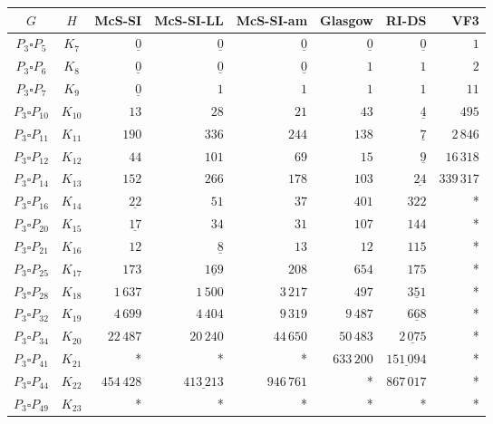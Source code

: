 
\begin{tabular}{ccrrrrrr}
    \toprule
    {$G$} & {$H$} & {McS-SI} & {McS-SI-LL} & {McS-SI-am} & Glasgow & RI-DS & VF3\\ 
    \midrule

$P_3\square P_{5}$ & $K_{7}$ & $\underline{0}$ & $\underline{0}$ & $\underline{0}$ & $\underline{0}$ & $\underline{0}$ & $1$\\
$P_3\square P_{6}$ & $K_{8}$ & $\underline{0}$ & $\underline{0}$ & $\underline{0}$ & $1$ & $1$ & $2$\\
$P_3\square P_{7}$ & $K_{9}$ & $\underline{0}$ & $1$ & $1$ & $1$ & $1$ & $11$\\
$P_3\square P_{10}$ & $K_{10}$ & $13$ & $28$ & $21$ & $43$ & $\underline{4}$ & $495$\\
$P_3\square P_{11}$ & $K_{11}$ & $190$ & $336$ & $244$ & $138$ & $\underline{7}$ & $2\,846$\\
$P_3\square P_{12}$ & $K_{12}$ & $44$ & $101$ & $69$ & $15$ & $\underline{9}$ & $16\,318$\\
$P_3\square P_{14}$ & $K_{13}$ & $152$ & $266$ & $178$ & $103$ & $\underline{24}$ & $339\,317$\\
$P_3\square P_{16}$ & $K_{14}$ & $\underline{22}$ & $51$ & $37$ & $401$ & $322$ & *\\
$P_3\square P_{20}$ & $K_{15}$ & $\underline{17}$ & $34$ & $31$ & $107$ & $144$ & *\\
$P_3\square P_{21}$ & $K_{16}$ & $12$ & $\underline{8}$ & $13$ & $12$ & $115$ & *\\
$P_3\square P_{25}$ & $K_{17}$ & $173$ & $\underline{169}$ & $208$ & $654$ & $175$ & *\\
$P_3\square P_{28}$ & $K_{18}$ & $1\,637$ & $1\,500$ & $3\,217$ & $497$ & $\underline{351}$ & *\\
$P_3\square P_{32}$ & $K_{19}$ & $4\,699$ & $4\,404$ & $9\,319$ & $9\,487$ & $\underline{668}$ & *\\
$P_3\square P_{34}$ & $K_{20}$ & $22\,487$ & $20\,240$ & $44\,650$ & $50\,483$ & $\underline{2\,075}$ & *\\
$P_3\square P_{41}$ & $K_{21}$ & * & * & * & $633\,200$ & $\underline{151\,094}$ & *\\
$P_3\square P_{44}$ & $K_{22}$ & $454\,428$ & $\underline{413\,213}$ & $946\,761$ & * & $867\,017$ & *\\
$P_3\square P_{49}$ & $K_{23}$ & * & * & * & * & * & *\\

    \bottomrule
\end{tabular}

